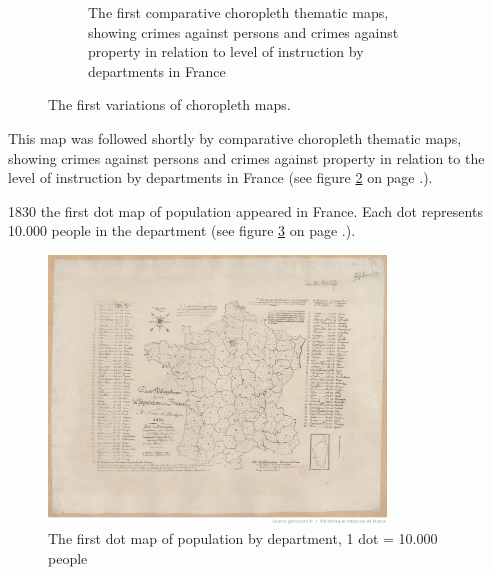 \begin{figure}[!htb]
\begin{subfigure}[t]{0.4\textwidth}
    \caption{The first comparative choropleth thematic maps, showing crimes against persons and crimes against property in relation to level of instruction by departments in France}
    \label{fig:second-choropleth}
  \end{subfigure}
  \caption[
    First variations of choropleth maps, Urldate: 07.2016 \newline
    \small\texttt{\url{http://datavis.ca/milestones//admin/uploads/images/dupin.gif}} \newline
    \small\texttt{\url{https://axismaps.github.io/thematic-cartography/images/divxdiv.png}}
  ]{
    The first variations of choropleth maps.
  }
\end{figure}

This map was followed shortly by comparative choropleth thematic maps, showing crimes against persons and crimes against property in relation to the level of instruction by departments in France (see figure \ref{fig:second-choropleth} on page \pageref{fig:second-choropleth}.).

1830 the first dot map of population appeared in France. Each dot represents 10.000 people in the department (see figure \ref{fig:first-dotmap} on page \pageref{fig:first-dotmap}.).

\begin{figure}[!htb]
\centering
\includegraphics[width=0.8\textwidth,keepaspectratio]{images/history/montizon-dotmap2.jpeg}
\caption[
    The first dot map of population by department, 1 dot = 10.000 people, Urldate: 07.2016 \newline
\small\texttt{\url{http://gallica.bnf.fr/ark:/12148/btv1b8492261j/f1.highres}}
]{The first dot map of population by department, 1 dot = 10.000 people}
\label{fig:first-dotmap}
\end{figure}


